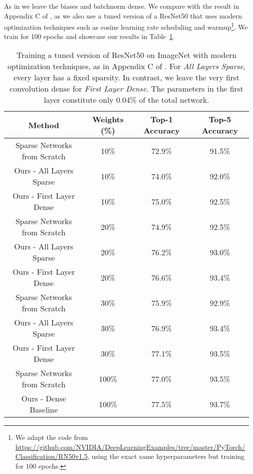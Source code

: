 \documentclass{article}
\begin{document}
As in \cite{sparse} we leave the biases and batchnorm dense. We compare with the result in Appendix C of \cite{sparse}, as we also use a tuned version of a ResNet50 that uses modern optimization techniques such as cosine learning rate scheduling and warmup\footnote{We adapt the code from \url{https://github.com/NVIDIA/DeepLearningExamples/tree/master/PyTorch/Classification/RN50v1.5}, using the exact same hyperparameters but training for 100 epochs.}. We train for 100 epochs and showcase our results in Table~\ref{tab:sparse}.
\begin{table}
  \caption{Training a tuned version of ResNet50 on ImageNet with modern optimization techniques, as in Appendix C of \cite{sparse}. For \textit{All Layers Sparse}, every layer has a fixed sparsity. In contrast, we leave the very first convolution dense for \textit{First Layer Dense}. The parameters in the first layer constitute only 0.04\% of the total network.}
  \small
  \centering
  \begin{tabular}{cccc}
    \toprule
    Method   & Weights (\%)    & Top-1 Accuracy & Top-5 Accuracy \\
    \midrule
    Sparse Networks from Scratch \cite{sparse} & 10\% & 72.9\% & 91.5\% \\
    Ours - All Layers Sparse & 10\% & 74.0\% & 92.0\% \\
    Ours - First Layer Dense & 10\% & 75.0\% & 92.5\% \\
    \midrule
    Sparse Networks from Scratch \cite{sparse} & 20\% & 74.9\% &  92.5\% \\
    Ours - All Layers Sparse & 20\% & 76.2\% & 93.0\% \\
    Ours - First Layer Dense & 20\% & 76.6\% & 93.4\% \\
    \midrule
    Sparse Networks from Scratch \cite{sparse} & 30\% & 75.9\% & 92.9\% \\
    Ours - All Layers Sparse & 30\% & 76.9\% & 93.4\% \\
    Ours - First Layer Dense & 30\% & 77.1\% & 93.5\% \\
    \midrule
Sparse Networks from Scratch \cite{sparse} & 100\% & 77.0\% &  93.5\% \\
    Ours - Dense Baseline & 100\% & 77.5\% & 93.7\% \\
    \bottomrule
  \end{tabular}
  \label{tab:sparse}
\end{table}
\end{document}
